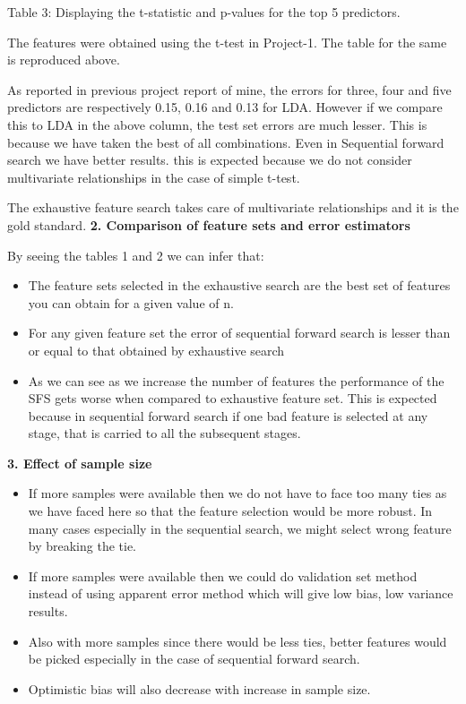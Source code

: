 \documentclass[paper=a4, fontsize=11pt]{scrartcl} %
\begin{document}
\hspace{2 cm} Table 3: Displaying the t-statistic and p-values for the top 5 predictors.
\newline

The features were obtained using the t-test in Project-1. The table for the same is reproduced above. 

As reported in previous project report of mine, the errors for three, four and five predictors are respectively 0.15, 0.16 and 0.13 for LDA. However if we compare this to LDA in the above column, the test set errors are much lesser. This is because we have taken the best of all combinations. Even in Sequential forward search we have better results. this is expected because we do not consider multivariate relationships in the case of simple t-test.

The exhaustive feature search takes care of multivariate relationships and it is the gold standard. \newline \newline
\textbf{2. Comparison of feature sets and error estimators }

By seeing the tables 1 and 2 we can infer that:
\begin{itemize}
\item The feature sets selected in the exhaustive search are the best set of features you can obtain for a given value of n. 

\item For any given feature set the error of sequential forward search is lesser than or equal to that obtained by exhaustive search

\item As we can see as we increase the number of features the performance of the SFS gets worse when compared to exhaustive feature set. This is expected because in sequential forward search if one bad feature is selected at any stage, that is carried to all the subsequent stages. \newline 
\end{itemize}
\textbf{3. Effect of sample size}
\begin{itemize}
\item If more samples were available then we do not have to face too many ties as we have faced here so that the feature selection would be more robust. In many cases especially in the sequential search, we might select wrong feature by breaking the tie.

\item If more samples were available then we could do validation set method instead of using apparent error method which will give low bias, low variance results.

\item Also with more samples since there would be less ties, better features would be picked especially in the case of sequential forward search.

\item Optimistic bias will also decrease with increase in sample size.


\end{itemize}
\end{document}
